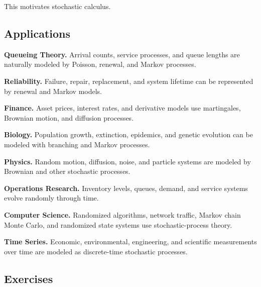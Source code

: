 This motivates stochastic calculus.

\subsection{Applications}
\label{subsec:stochastic-process-applications}

\begin{applicationbox}

\textbf{Queueing Theory.}
Arrival counts, service processes, and queue lengths are naturally
modeled by Poisson, renewal, and Markov processes.

\medskip

\textbf{Reliability.}
Failure, repair, replacement, and system lifetime can be represented by
renewal and Markov models.

\medskip

\textbf{Finance.}
Asset prices, interest rates, and derivative models use martingales,
Brownian motion, and diffusion processes.

\medskip

\textbf{Biology.}
Population growth, extinction, epidemics, and genetic evolution can be
modeled with branching and Markov processes.

\medskip

\textbf{Physics.}
Random motion, diffusion, noise, and particle systems are modeled by
Brownian and other stochastic processes.

\medskip

\textbf{Operations Research.}
Inventory levels, queues, demand, and service systems evolve randomly
through time.

\medskip

\textbf{Computer Science.}
Randomized algorithms, network traffic, Markov chain Monte Carlo, and
randomized state systems use stochastic-process theory.

\medskip

\textbf{Time Series.}
Economic, environmental, engineering, and scientific measurements over
time are modeled as discrete-time stochastic processes.

\end{applicationbox}

\subsection{Exercises}
\label{subsec:stochastic-process-exercises}

